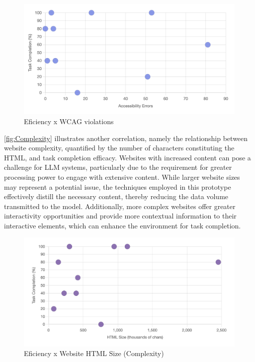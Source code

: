 \documentclass[conference]{IEEEtran}
\begin{document}
\begin{figure}[h]
    \centering
    \includegraphics[width=1\linewidth]{images/eficiencexerrors.png}
    \caption{Eficiency x WCAG violations}
    \label{fig:violations}
\end{figure}

\autoref{fig:Complexity} illustrates another correlation, namely the relationship between website complexity, quantified by the number of characters constituting the HTML, and task completion efficacy. Websites with increased content can pose a challenge for LLM systems, particularly due to the requirement for greater processing power to engage with extensive content. While larger website sizes may represent a potential issue, the techniques employed in this prototype effectively distill the necessary content, thereby reducing the data volume transmitted to the model. Additionally, more complex websites offer greater interactivity opportunities and provide more contextual information to their interactive elements, which can enhance the environment for task completion.
\begin{figure}[h]
    \centering
    \includegraphics[width=1\linewidth]{images/efficiencexcomplexity.png}
    \caption{Eficiency x Website HTML Size (Complexity)}
    \label{fig:Complexity}
\end{figure}
\end{document}
